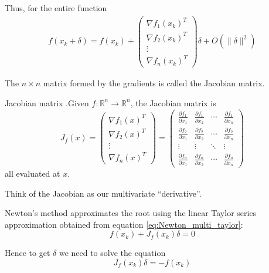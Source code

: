 \documentclass[12pt,letterpaper]{article}
\newcommand{\R}{\mathbb{R}}
\begin{document}
Thus, for the entire function
\begin{align} \label{eq:Newton_multi_taylor}
f(x_k + \delta) = f(x_k) + \begin{pmatrix}
	\nabla f_1(x_k)^T \\
	\nabla f_2(x_k)^T \\
	\vdots \\
	\nabla f_n(x_k)^T
\end{pmatrix} \delta + O(\lVert \delta \rVert^2)
\end{align}

The $n \times n$ matrix formed by the gradients is called the Jacobian matrix.

\begin{defn}{Jacobian matrix}
.Given $f : \R^n \rightarrow \R^n$, the Jacobian matrix is
\begin{equation}
J_f(x) = \begin{pmatrix}
	\nabla f_1(x)^T \\
	\nabla f_2(x)^T \\
	\vdots \\
	\nabla f_n(x)^T
\end{pmatrix} =
\begin{pmatrix}
	\frac{\partial f_1}{\partial x_1} & \frac{\partial f_1}{\partial x_2} & \cdots & \frac{\partial f_1}{\partial x_n} \\
	\frac{\partial f_2}{\partial x_1} & \frac{\partial f_2}{\partial x_2} & \cdots & \frac{\partial f_2}{\partial x_n} \\
	\vdots & \vdots & \ddots & \vdots \\
	\frac{\partial f_n}{\partial x_1} & \frac{\partial f_n}{\partial x_2} & \cdots & \frac{\partial f_n}{\partial x_n}
\end{pmatrix}
\end{equation}
all evaluated at $x$.

Think of the Jacobian as our multivariate ``derivative''.
\end{defn}

Newton's method approximates the root using the linear Taylor series approximation obtained from equation \ref{eq:Newton_multi_taylor}:
\begin{equation}
	f(x_k) + J_f(x_k) \delta = 0
\end{equation}

Hence to get $\delta$ we need to solve the equation
\begin{equation}
	J_f(x_k) \delta = -f(x_k)
\end{equation}
\end{document}
